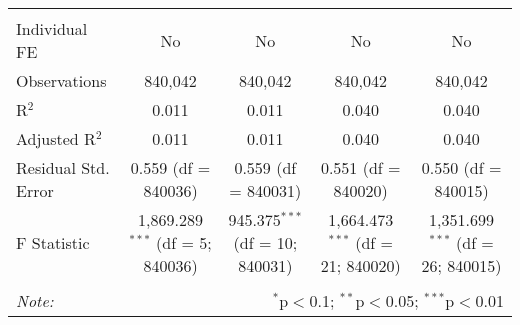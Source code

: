 \documentclass[
]{article}
\begin{document}
\begin{table}[!htbp]
{\begin{tabular}{@{\extracolsep{5pt}}lcccc}
\hline \\[-1.8ex] 
Individual FE & No & No & No & No \\ 
Observations & 840,042 & 840,042 & 840,042 & 840,042 \\ 
R$^{2}$ & 0.011 & 0.011 & 0.040 & 0.040 \\ 
Adjusted R$^{2}$ & 0.011 & 0.011 & 0.040 & 0.040 \\ 
Residual Std. Error & 0.559 (df = 840036) & 0.559 (df = 840031) & 0.551 (df = 840020) & 0.550 (df = 840015) \\ 
F Statistic & 1,869.289$^{***}$ (df = 5; 840036) & 945.375$^{***}$ (df = 10; 840031) & 1,664.473$^{***}$ (df = 21; 840020) & 1,351.699$^{***}$ (df = 26; 840015) \\ 
\hline 
\hline \\[-1.8ex] 
\textit{Note:}  & \multicolumn{4}{r}{$^{*}$p$<$0.1; $^{**}$p$<$0.05; $^{***}$p$<$0.01} \\ 
\end{tabular}
} 
\end{table} 
\newpage
\end{document}
